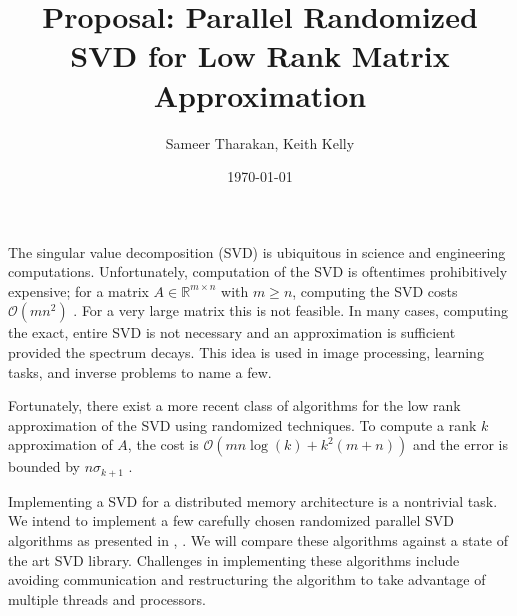 \documentclass[a4paper]{article}
\title{Proposal: Parallel Randomized SVD for Low Rank Matrix Approximation}
\date{\today}
\author{Sameer Tharakan, Keith Kelly}
\begin{document}
\maketitle

The singular value decomposition (SVD) is ubiquitous in science and engineering computations. 
Unfortunately, computation of the SVD is oftentimes prohibitively expensive; for a matrix $A\in\mathbb{R}^{m \times n}$ with $m\geq n$, computing the SVD costs $\mathcal{O}(mn^2)$ \cite{golub2012matrix}.
For a very large matrix this is not feasible.
In many cases, computing the exact, entire SVD is not necessary and an approximation is sufficient provided the spectrum decays. 
This idea is used in image processing, learning tasks, and inverse problems to name a few.

Fortunately, there exist a more recent class of algorithms for the low rank approximation of the SVD using randomized techniques.
To compute a rank $k$ approximation of $A$, the cost is $\mathcal{O}(mn\log(k) + k^2(m+n))$ and the error is bounded by $n\sigma_{k+1}$ \cite{halko2011finding}.

Implementing a SVD for a distributed memory architecture is a nontrivial task.
We intend to implement a few carefully chosen randomized parallel SVD algorithms as presented in \cite{halko2011finding}, \cite{kontoghiorghes2005handbook}.
We will compare these algorithms against a state of the art SVD library.
Challenges in implementing these algorithms include avoiding communication \cite{ballard2010minimizing} and restructuring the algorithm to take advantage of multiple threads and processors.

{
}
\end{document}
